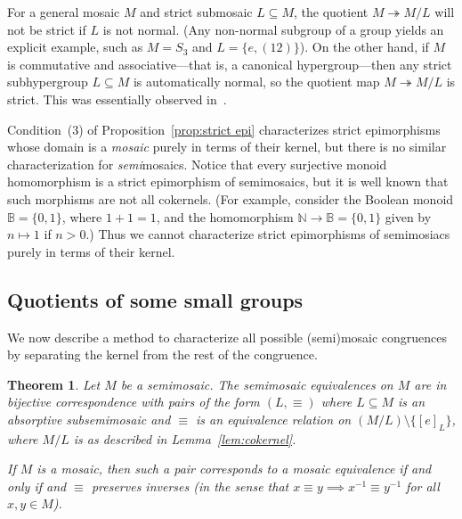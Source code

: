 \documentclass[reqno]{amsart}
\newcommand{\separate}{\bigskip}
\numberwithin{equation}{section}
\theoremstyle{plain}
\newtheorem{theorem}[equation]{Theorem}
\theoremstyle{definition}
\begin{document}
For a general mosaic $M$ and strict submosaic $L \subseteq M$, the quotient $M \twoheadrightarrow M/L$ will not be strict if $L$ is not normal. (Any non-normal subgroup of a group yields an explicit example, such as $M=S_3$ and $L=\{e, (12)\}$). 
On the other hand, if $M$ is commutative and associative---that is, a canonical hypergroup---then any strict subhypergroup $L \subseteq M$ is automatically normal, so the quotient map $M \twoheadrightarrow M/L$ is strict. This was essentially observed in~\cite[Corollary~3.17]{Jun:geometry}.

\separate

Condition~(3) of
Proposition~\ref{prop:strict epi} characterizes strict epimorphisms whose domain is a \emph{mosaic} purely in terms of their kernel, but there is no similar characterization for \emph{semi}mosaics. 
Notice that every surjective monoid homomorphism is a strict epimorphism of semimosaics, but it is well known that such morphisms are not all cokernels. (For example, consider the Boolean monoid $\mathbb{B} = \{0,1\}$, where $1 + 1 = 1$, and the homomorphism $\mathbb{N}\rightarrow\mathbb{B}=\{0, 1\}$ given by $n\mapsto 1$ if $n>0$.) 
Thus we cannot characterize strict epimorphisms of semimosiacs purely in terms of their kernel.




\subsection{Quotients of some small groups}

We now describe a method to characterize all possible (semi)mosaic congruences by separating the kernel from the rest of the congruence. 


\begin{theorem}\label{thm:pairs}
Let $M$ be a semimosaic. The semimosaic equivalences on $M$ are in bijective correspondence with pairs of the form $(L, \equiv)$ where $L \subseteq M$ is an absorptive subsemimosaic and $\equiv$ is an equivalence relation on $(M / L) \setminus \{[e]_L\}$, where $M/L$ is as described in Lemma~\ref{lem:cokernel}.

If $M$ is a mosaic, then such a pair corresponds to a mosaic equivalence if and only if and $\equiv$ preserves inverses (in the sense that $x \equiv y \implies x^{-1} \equiv y^{-1}$ for all $x,y \in M$).
\end{theorem}
\end{document}
